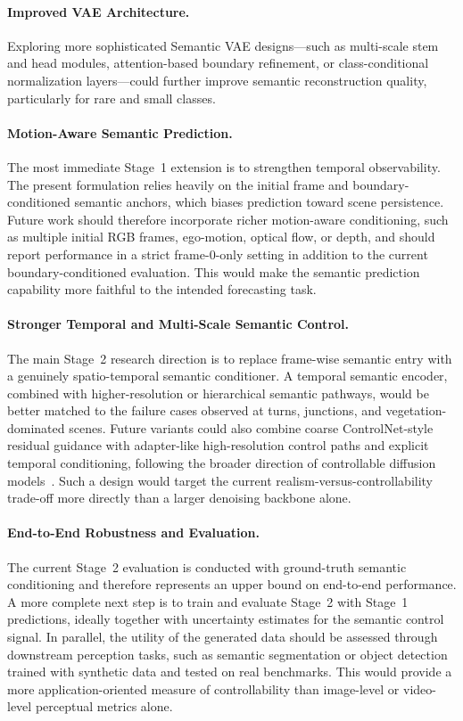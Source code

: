 \paragraph{Improved VAE Architecture.}
Exploring more sophisticated Semantic VAE designs---such as multi-scale stem and head modules, attention-based boundary refinement, or class-conditional normalization layers---could further improve semantic reconstruction quality, particularly for rare and small classes.

\paragraph{Motion-Aware Semantic Prediction.}
The most immediate Stage~1 extension is to strengthen temporal observability. The present formulation relies heavily on the initial frame and boundary-conditioned semantic anchors, which biases prediction toward scene persistence. Future work should therefore incorporate richer motion-aware conditioning, such as multiple initial RGB frames, ego-motion, optical flow, or depth, and should report performance in a strict frame-0-only setting in addition to the current boundary-conditioned evaluation. This would make the semantic prediction capability more faithful to the intended forecasting task.

\paragraph{Stronger Temporal and Multi-Scale Semantic Control.}
The main Stage~2 research direction is to replace frame-wise semantic entry with a genuinely spatio-temporal semantic conditioner. A temporal semantic encoder, combined with higher-resolution or hierarchical semantic pathways, would be better matched to the failure cases observed at turns, junctions, and vegetation-dominated scenes. Future variants could also combine coarse ControlNet-style residual guidance with adapter-like high-resolution control paths and explicit temporal conditioning, following the broader direction of controllable diffusion models~\cite{zhang2023adding,mou2024t2i,hu2023videocontrolnet}. Such a design would target the current realism-versus-controllability trade-off more directly than a larger denoising backbone alone.

\paragraph{End-to-End Robustness and Evaluation.}
The current Stage~2 evaluation is conducted with ground-truth semantic conditioning and therefore represents an upper bound on end-to-end performance. A more complete next step is to train and evaluate Stage~2 with Stage~1 predictions, ideally together with uncertainty estimates for the semantic control signal. In parallel, the utility of the generated data should be assessed through downstream perception tasks, such as semantic segmentation or object detection trained with synthetic data and tested on real benchmarks. This would provide a more application-oriented measure of controllability than image-level or video-level perceptual metrics alone.

